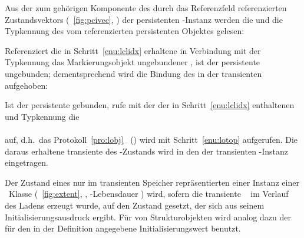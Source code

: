 \begin{infol}
\begin{block}
%
\item\label{enu:lclidx} Aus der zum \Slt\/ geh\"{o}rigen Komponente des
durch das Referenzfeld referenzierten Zustandsvektors
(\figurename~\ref{fig:pcivec}, \citepage{\pageref{fig:pcivec}}) der
persistenten \clos-Instanz werden die \sobjid\/ und die Typkennung des
vom \Slt\/ referenzierten persistenten Objektes gelesen:\\
%
\item Referenziert die in Schritt~\ref{enu:lclidx} erhaltene
\sobjid\/ in Verbindung mit der Typkennung das Markierungsobjekt
\rglq{}ungebundener \Slt\rgrq, ist der persistente \Slt\/ ungebunden;
dem\-ent\-spre\-chend wird die Bindung des \Slt[s]\/ in der
transienten \representation{} aufgehoben:\\
%
\item Ist der persistente \Slt\/ gebunden, rufe mit der
der in Schritt~\ref{enu:lclidx} enthaltenen \sobjid\/ und
Typkennung die \gfn\\
\\
auf, d.h.\ das Protokoll~\ref{pro:lobj}
\ (\citepage{\pageref{pro:lobj}}) wird mit
Schritt~\ref{enu:lotop} aufgerufen. Die daraus erhaltene transiente
\representation{} des \Slt\/-Zustands wird in den \Slt\/ der transienten
\clos-Instanz eingetragen.
%
\end{block}
%
\end{infol}
%
\par{}Der Zustand eines nur im transienten Speicher repr\"{a}sentierten
\Slt[s]\/ einer Instanz einer \clos\ Klasse
(\figurename~\ref{fig:extent}, \citepage{\pageref{fig:extent}},
\Slt\/-Lebensdauer ) wird, sofern die transiente
\clos\ \representation{} im Verlauf des Ladens erzeugt wurde, auf den
Zustand gesetzt, der sich aus seinem Initialisierungsausdruck ergibt.
F\"{u}r \Slt[s]\/ von Strukturobjekten wird analog dazu der f\"{u}r den
\Slt\/ in der Definition angegebene Initialisierungswert benutzt.
%
